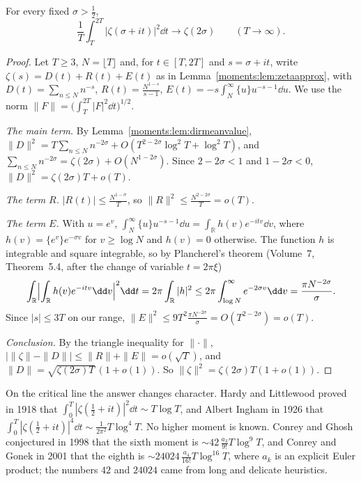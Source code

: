 \begin{theorem}\label{moments:thm:meansquare}
For every fixed $\sigma>\frac12$,
\[
\frac1T\int_T^{2T}|\zeta(\sigma+it)|^2\dd t\longrightarrow\zeta(2\sigma)\qquad(T\to\infty).
\]
\end{theorem}
\begin{proof}
Let $T\ge3$, $N=\lfloor T\rfloor$ and, for $t\in[T,2T]$ and $s=\sigma+it$, write $\zeta(s)=D(t)+R(t)+E(t)$ as in Lemma~\ref{moments:lem:zetaapprox}, with
$D(t)=\sum_{n\le N}n^{-s}$, $R(t)=\frac{N^{1-s}}{s-1}$, $E(t)=-s\int_N^\infty\{u\}u^{-s-1}\dd u$. We use the norm $\|F\|=\bigl(\int_T^{2T}|F|^2\dd t\bigr)^{1/2}$.

\emph{The main term.} By Lemma~\ref{moments:lem:dirmeanvalue}, $\|D\|^2=T\sum_{n\le N}n^{-2\sigma}+O(T^{2-2\sigma}\log^2T+\log^2T)$, and
$\sum_{n\le N}n^{-2\sigma}=\zeta(2\sigma)+O(N^{1-2\sigma})$. Since $2-2\sigma<1$ and $1-2\sigma<0$, $\|D\|^2=\zeta(2\sigma)T+o(T)$.

\emph{The term $R$.} $|R(t)|\le\frac{N^{1-\sigma}}T$, so $\|R\|^2\le\frac{N^{2-2\sigma}}T=o(T)$.

\emph{The term $E$.} With $u=e^v$, $\int_N^\infty\{u\}u^{-s-1}\dd u=\int_{\mathbb R}h(v)e^{-itv}\dd v$, where $h(v)=\{e^v\}e^{-\sigma v}$ for $v\ge\log N$ and $h(v)=0$
otherwise. The function $h$ is integrable and square integrable, so by Plancherel's theorem (Volume~7, Theorem~5.4, after the change of variable $t=2\pi\xi$)
\[
\int_{\mathbb R}\Bigl|\int_{\mathbb R}h(v)e^{-itv}\dd v\Bigr|^2\dd t=2\pi\int_{\mathbb R}|h|^2\le2\pi\int_{\log N}^\infty e^{-2\sigma v}\dd v=\frac{\pi N^{-2\sigma}}\sigma.
\]
Since $|s|\le3T$ on our range, $\|E\|^2\le9T^2\frac{\pi N^{-2\sigma}}\sigma=O(T^{2-2\sigma})=o(T)$.

\emph{Conclusion.} By the triangle inequality for $\|\cdot\|$, $\bigl|\|\zeta\|-\|D\|\bigr|\le\|R\|+\|E\|=o(\sqrt T)$, and $\|D\|=\sqrt{\zeta(2\sigma)T}\,(1+o(1))$. So
$\|\zeta\|^2=\zeta(2\sigma)T(1+o(1))$.
\end{proof}

On the critical line the answer changes character. Hardy and Littlewood proved in 1918 that $\int_0^T|\zeta(\frac12+it)|^2\dd t\sim T\log T$, and Albert
Ingham in 1926 that $\int_0^T|\zeta(\frac12+it)|^4\dd t\sim\frac1{2\pi^2}T\log^4T$. No higher moment is known. Conrey and Ghosh conjectured in 1998 that
the sixth moment is $\sim42\,\frac{a_3}{9!}T\log^9T$, and Conrey and Gonek in 2001 that the eighth is $\sim24024\,\frac{a_4}{16!}T\log^{16}T$, where $a_k$ is
an explicit Euler product; the numbers $42$ and $24024$ came from long and delicate heuristics.

